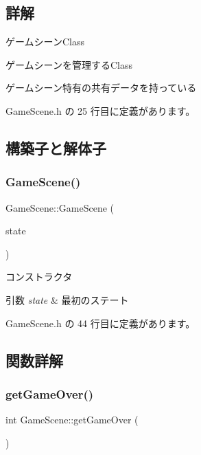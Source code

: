 \subsection{詳解}
ゲームシーン\+Class 

ゲームシーンを管理する\+Class

ゲームシーン特有の共有データを持っている 

 Game\+Scene.\+h の 25 行目に定義があります。



\subsection{構築子と解体子}
\mbox{\label{class_game_scene_a25e9e82ce85255dac27cd6489751bd40}} 
\subsubsection{\texorpdfstring{Game\+Scene()}{GameScene()}}
{\footnotesize\ttfamily Game\+Scene\+::\+Game\+Scene (\begin{DoxyParamCaption}\item[{\mbox{\hyperlink{class_scene_base_1_1_state_base}{State\+Base}} $\ast$}]{state }\end{DoxyParamCaption})\hspace{0.3cm}{\ttfamily [inline]}}



コンストラクタ 


\begin{DoxyParams}{引数}
{\em state} & 最初のステート \\
\hline
\end{DoxyParams}


 Game\+Scene.\+h の 44 行目に定義があります。



\subsection{関数詳解}
\mbox{\label{class_game_scene_a2f8413f473bc9a937fa02bfd4678d61d}} 
\subsubsection{\texorpdfstring{get\+Game\+Over()}{getGameOver()}}
{\footnotesize\ttfamily int Game\+Scene\+::get\+Game\+Over (\begin{DoxyParamCaption}{ }\end{DoxyParamCaption})\hspace{0.3cm}{\ttfamily [inline]}}



